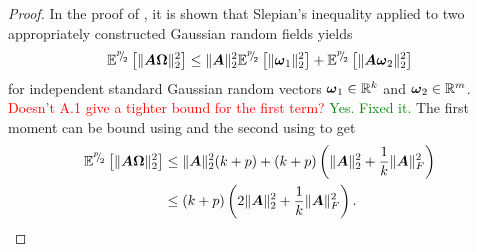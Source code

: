\documentclass[12pt]{article}
\begin{document}
\begin{proof}
    In the proof of \cite[Lemma B.1]{tropp-2023-randomized-algorithms}, it is shown that Slepian's inequality \cite[Theorem 7.2.1]{vershynin-2018-highdimensional-probability} applied to two appropriately constructed Gaussian random fields yields
    \begin{equation}
        \mathbb{E}^{{}^{p}{\mskip -5mu/\mskip -3mu}_{2}}\left[ \lVert \boldsymbol{A} \boldsymbol{\Omega} \rVert _2^2 \right]
        \leq \lVert \boldsymbol{A} \rVert _2^2 \mathbb{E}^{{}^{p}{\mskip -5mu/\mskip -3mu}_{2}}\left[ \lVert \boldsymbol{\omega}_1 \rVert _2^2 \right] + \mathbb{E}^{{}^{p}{\mskip -5mu/\mskip -3mu}_{2}}\left[ \lVert \boldsymbol{A} \boldsymbol{\omega}_2 \rVert _2^2 \right]
    \end{equation}
    for independent standard Gaussian random vectors $\boldsymbol{\omega}_1 \in \mathbb{R}^{k}$ and $\boldsymbol{\omega}_2 \in \mathbb{R}^{m}$. \textcolor{red}{Doesn't A.1 give a tighter bound for the first term?} \textcolor{green}{Yes. Fixed it.} The first moment can be bound using  and the second using  to get
    \begin{align}
        \mathbb{E}^{{}^{p}{\mskip -5mu/\mskip -3mu}_{2}}\left[ \lVert \boldsymbol{A} \boldsymbol{\Omega} \rVert _2^2 \right]
        &\leq \lVert \boldsymbol{A} \rVert _2^2 (k + p)  + (k + p) \left( \lVert \boldsymbol{A} \rVert _2^2 + \frac{1}{k} \lVert \boldsymbol{A} \rVert _F^2 \right) \notag \\
        &\leq (k + p) \left( 2 \lVert \boldsymbol{A} \rVert _2^2 + \frac{1}{k} \lVert \boldsymbol{A} \rVert _F^2 \right).
    \end{align}


\end{proof}
\end{document}
